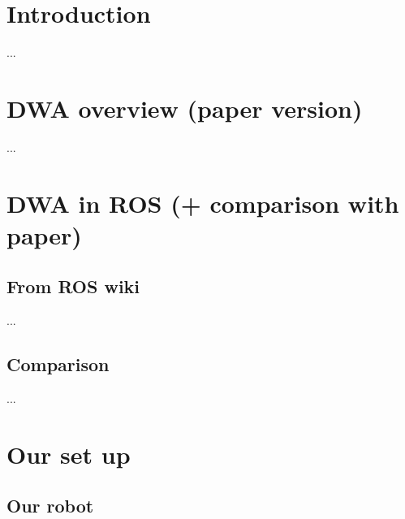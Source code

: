 \documentclass[11pt,a4paper]{article}
\begin{document}



\newpage

\renewcommand*\contentsname{Table of Contents}
\tableofcontents

\newpage


\section{Introduction}
\label{sec:introduction}

...

\section{DWA overview (paper version)}
\label{sec:}

...


\section{DWA in ROS (+ comparison with paper)}
\label{sec:}

\subsection{From ROS wiki}

...

\subsection{Comparison}

...


\section{Our set up}
\label{sec:}

\subsection{Our robot}
\end{document}
